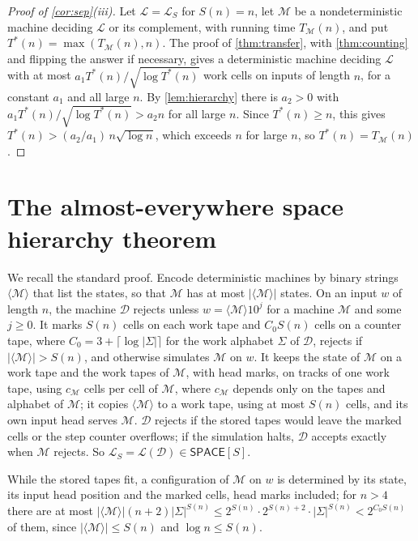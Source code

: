 \documentclass[11pt]{article}
\theoremstyle{definition}
\theoremstyle{definition}
\theoremstyle{remark}
\newcommand{\SPACE}{\mathsf{SPACE}}
\begin{document}
\begin{proof}[Proof of \cref{cor:sep}(iii)]
Let $\mathcal L=\mathcal L_S$ for $S(n)=n$, let $\mathcal M$ be a nondeterministic machine deciding $\mathcal L$ or its complement, with running time $T_{\mathcal M}(n)$, and put $T^*(n)=\max(T_{\mathcal M}(n),n)$. The proof of \cref{thm:transfer}, with \cref{thm:counting} and flipping the answer if necessary, gives a deterministic machine deciding $\mathcal L$ with at most $a_1T^*(n)/\sqrt{\log T^*(n)}$ work cells on inputs of length $n$, for a constant $a_1$ and all large $n$. By \cref{lem:hierarchy} there is $a_2>0$ with $a_1T^*(n)/\sqrt{\log T^*(n)}>a_2n$ for all large $n$. Since $T^*(n)\ge n$, this gives $T^*(n)>(a_2/a_1)\,n\sqrt{\log n}$, which exceeds $n$ for large $n$, so $T^*(n)=T_{\mathcal M}(n)$.
\end{proof}

\section{The almost-everywhere space hierarchy theorem}\label{app:hierarchy}

We recall the standard proof. Encode deterministic machines by binary strings $\langle\mathcal M\rangle$ that list the states, so that $\mathcal M$ has at most $|\langle\mathcal M\rangle|$ states. On an input $w$ of length $n$, the machine $\mathcal D$ rejects unless $w=\langle\mathcal M\rangle10^j$ for a machine $\mathcal M$ and some $j\ge0$. It marks $S(n)$ cells on each work tape and $C_0S(n)$ cells on a counter tape, where $C_0=3+\lceil\log|\Sigma|\rceil$ for the work alphabet $\Sigma$ of $\mathcal D$, rejects if $|\langle\mathcal M\rangle|>S(n)$, and otherwise simulates $\mathcal M$ on $w$. It keeps the state of $\mathcal M$ on a work tape and the work tapes of $\mathcal M$, with head marks, on tracks of one work tape, using $c_{\mathcal M}$ cells per cell of $\mathcal M$, where $c_{\mathcal M}$ depends only on the tapes and alphabet of $\mathcal M$; it copies $\langle\mathcal M\rangle$ to a work tape, using at most $S(n)$ cells, and its own input head serves $\mathcal M$. $\mathcal D$ rejects if the stored tapes would leave the marked cells or the step counter overflows; if the simulation halts, $\mathcal D$ accepts exactly when $\mathcal M$ rejects. So $\mathcal L_S=\mathcal L(\mathcal D)\in\SPACE[S]$.

While the stored tapes fit, a configuration of $\mathcal M$ on $w$ is determined by its state, its input head position and the marked cells, head marks included; for $n>4$ there are at most $|\langle\mathcal M\rangle|(n+2)|\Sigma|^{S(n)}\le2^{S(n)}\cdot2^{S(n)+2}\cdot|\Sigma|^{S(n)}<2^{C_0S(n)}$ of them, since $|\langle\mathcal M\rangle|\le S(n)$ and $\log n\le S(n)$.
\end{document}
